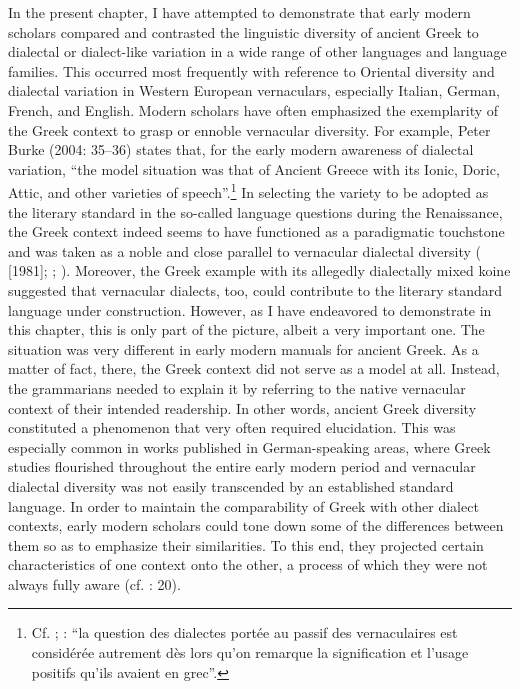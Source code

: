 In the present chapter, I have attempted to demonstrate that early modern scholars compared and contrasted the linguistic diversity of ancient Greek to dialectal or dialect-like variation in a wide range of other languages and language families. This occurred most frequently with reference to Oriental diversity and dialectal variation in Western European vernaculars, especially Italian, German, French, and English. Modern scholars have often emphasized the exemplarity of the Greek context to grasp or ennoble vernacular diversity. For example, Peter Burke (2004: 35–36) states that, for the early modern awareness of dialectal variation, “the model situation was that of Ancient Greece with its Ionic, Doric, Attic, and other varieties of speech”.\footnote{Cf. \citet[923]{Haugen1966}; \citet[216]{Giard1992}: “la question des dialectes portée au passif des vernaculaires est considérée autrement dès lors qu’on remarque la signification et l’usage positifs qu’ils avaient en grec”.} In selecting the variety to be adopted as the literary standard in the so-called language questions during the Renaissance, the Greek context indeed seems to have functioned as a paradigmatic touchstone and was taken as a noble and close parallel to vernacular dialectal diversity (\citealt{Alinei1984} [1981]; \citealt{Trovato1984}; \citealt{Trapp1990}). Moreover, the Greek example with its allegedly dialectally mixed koine suggested that vernacular dialects, too, could contribute to the literary standard language under construction. However, as I have endeavored to demonstrate in this chapter, this is only part of the picture, albeit a very important one. The situation was very different in early modern manuals for ancient Greek. As a matter of fact, there, the Greek context did not serve as a model at all. Instead, the grammarians needed to explain it by referring to the native vernacular context of their intended readership. In other words, ancient Greek diversity constituted a phenomenon that very often required elucidation. This was especially common in works published in German-speaking areas, where Greek studies flourished throughout the entire early modern period and vernacular dialectal diversity was not easily transcended by an established standard language. In order to maintain the comparability of Greek with other dialect contexts, early modern scholars could tone down some of the differences between them so as to emphasize their similarities. To this end, they projected certain characteristics of one context onto the other, a process of which they were not always fully aware (cf. \citealt{Alinei1980}: 20).

